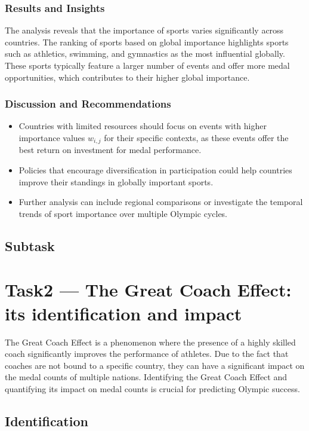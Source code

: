 \documentclass{mcmthesis}
\begin{document}
\subsubsection{Results and Insights}
The analysis reveals that the importance of sports varies significantly across countries. The ranking of sports based on global importance highlights sports such as athletics, swimming, and gymnastics as the most influential globally. These sports typically feature a larger number of events and offer more medal opportunities, which contributes to their higher global importance.

\subsubsection{Discussion and Recommendations}
\begin{itemize}
    \item Countries with limited resources should focus on events with higher importance values $w_{i,j}$ for their specific contexts, as these events offer the best return on investment for medal performance.
    \item Policies that encourage diversification in participation could help countries improve their standings in globally important sports.
    \item Further analysis can include regional comparisons or investigate the temporal trends of sport importance over multiple Olympic cycles.
\end{itemize}


\subsection{Subtask}

\section{Task2 --- The Great Coach Effect: its identification and impact}

The Great Coach Effect is a phenomenon where the presence of a highly skilled coach significantly improves the performance of athletes. Due to the fact that coaches are not bound to a specific country, they can have a significant impact on the medal counts of multiple nations. Identifying the Great Coach Effect and quantifying its impact on medal counts is crucial for predicting Olympic success.

\subsection{Identification}
\end{document}
